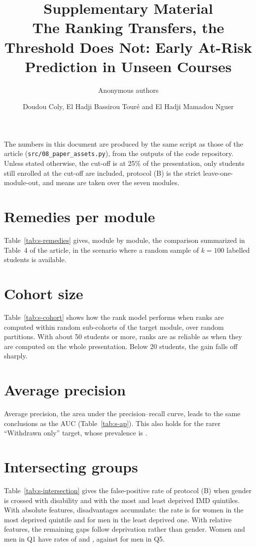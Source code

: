 \documentclass[10pt]{article}
\title{Supplementary Material\\[4pt]\large The Ranking Transfers, the Threshold Does Not: Early At-Risk Prediction in Unseen Courses}
\author{Anonymous authors}
\author{Doudou Coly, El Hadji Bassirou Tour\'e and El Hadji Mamadou Nguer}
\date{}
\newcommand{\cB}{(B)}
\begin{document}
\maketitle

The numbers in this document are produced by the same script as those of the article (\nolinkurl{src/08_paper_assets.py}), from the outputs of the code repository. Unless stated otherwise, the cut-off is at 25\% of the presentation, only students still enrolled at the cut-off are included, protocol \cB{} is the strict leave-one-module-out, and means are taken over the seven modules.

\section{Remedies per module}
Table~\ref{tab:s-remedies} gives, module by module, the comparison summarized in Table~4 of the article, in the scenario where a random sample of $k=100$ labelled students is available.



\section{Cohort size}
Table~\ref{tab:s-cohort} shows how the rank model performs when ranks are computed within random sub-cohorts of the target module, over \resNPartitions{} random partitions. With about 50 students or more, ranks are as reliable as when they are computed on the whole presentation. Below 20 students, the gain falls off sharply.



\section{Average precision}
Average precision, the area under the precision--recall curve, leads to the same conclusions as the AUC (Table~\ref{tab:s-ap}). This also holds for the rarer ``Withdrawn only'' target, whose prevalence is \resWdPrevalence.



\section{Intersecting groups}
Table~\ref{tab:s-intersection} gives the false-positive rate of protocol \cB{} when gender is crossed with disability and with the most and least deprived IMD quintiles. With absolute features, disadvantages accumulate: the rate is \resInterFQOneAbs{} for women in the most deprived quintile and \resInterMQFiveAbs{} for men in the least deprived one. With relative features, the remaining gaps follow deprivation rather than gender. Women and men in Q1 have rates of \resInterFQOneRel{} and \resInterMQOneRel, against \resInterMQFiveRel{} for men in Q5.
\end{document}
